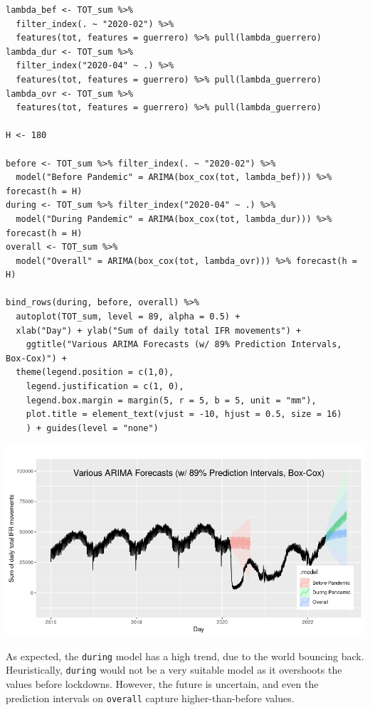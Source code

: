 \documentclass[8pt]{article}
\begin{document}
\begin{verbatim}
lambda_bef <- TOT_sum %>%
  filter_index(. ~ "2020-02") %>%
  features(tot, features = guerrero) %>% pull(lambda_guerrero)
lambda_dur <- TOT_sum %>%
  filter_index("2020-04" ~ .) %>%
  features(tot, features = guerrero) %>% pull(lambda_guerrero)
lambda_ovr <- TOT_sum %>%
  features(tot, features = guerrero) %>% pull(lambda_guerrero)

H <- 180

before <- TOT_sum %>% filter_index(. ~ "2020-02") %>%
  model("Before Pandemic" = ARIMA(box_cox(tot, lambda_bef))) %>% forecast(h = H)
during <- TOT_sum %>% filter_index("2020-04" ~ .) %>%
  model("During Pandemic" = ARIMA(box_cox(tot, lambda_dur))) %>% forecast(h = H)
overall <- TOT_sum %>%
  model("Overall" = ARIMA(box_cox(tot, lambda_ovr))) %>% forecast(h = H)

bind_rows(during, before, overall) %>%
  autoplot(TOT_sum, level = 89, alpha = 0.5) +
  xlab("Day") + ylab("Sum of daily total IFR movements") +
    ggtitle("Various ARIMA Forecasts (w/ 89% Prediction Intervals, Box-Cox)") +
  theme(legend.position = c(1,0),
	legend.justification = c(1, 0),
	legend.box.margin = margin(5, r = 5, b = 5, unit = "mm"),
	plot.title = element_text(vjust = -10, hjust = 0.5, size = 16)
	) + guides(level = "none")
\end{verbatim}

\begin{center}
\includegraphics[width=.9\linewidth]{./media/arima.png}
\end{center}

As expected, the \texttt{during} model has a high trend, due to the world bouncing back. Heuristically, \texttt{during} would not be a very suitable model as it overshoots the values before lockdowns. However, the future is uncertain, and even the prediction intervals on \texttt{overall} capture higher-than-before values.
\end{document}
